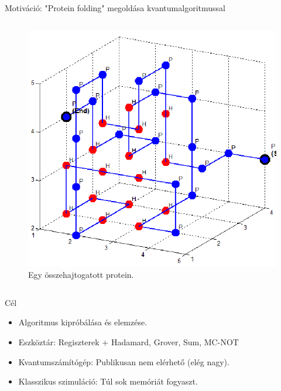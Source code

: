 \documentclass[aspectratio=169]{beamer}
\begin{document}
\begin{frame}{Motiváció: "Protein folding" megoldása kvantumalgoritmussal}
\begin{columns}
\begin{column}{0.45\textwidth}
\begin{figure}[H]
\center
\includegraphics[width=\textwidth]{./figures/Protein-folds-with-length-36-amino-acids-18-contacts.png}
\caption{Egy összehajtogatott protein.}
\end{figure}
\end{column}
\end{columns}

\end{frame}

\begin{frame}[t]{Cél}

\begin{itemize}
    \item Algoritmus kipróbálása és elemzése.
    \item Eszköztár: Regiszterek + Hadamard, Grover, Sum, MC-NOT
    \item Kvantumszámítógép: Publikusan nem elérhető (elég nagy).
    \item Klasszikus szimuláció: Túl sok memóriát fogyaszt.
\end{itemize}
\end{frame}
\end{document}
